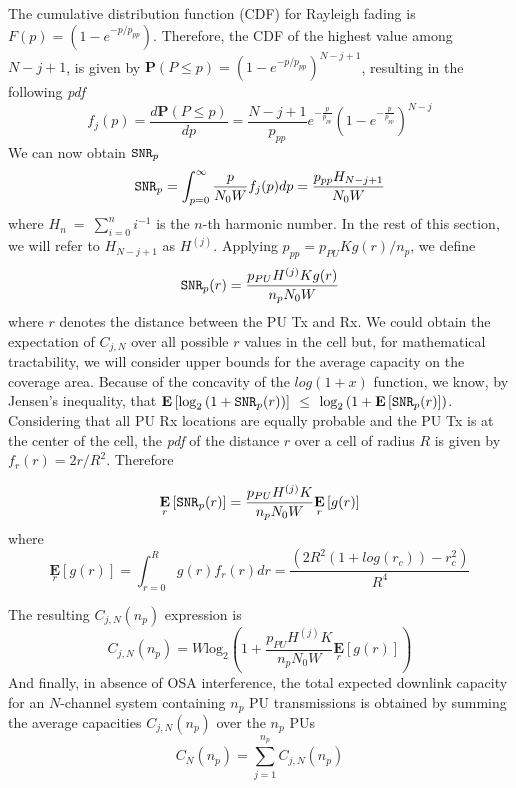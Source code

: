 The cumulative distribution function (CDF) for Rayleigh fading is $F(p)=\left(1-e^{-p/p_{pp}}\right)$.
Therefore, the CDF of the highest value among $N-j+1$, is given by $\mathbf{P}(P\leq p) = (1-e^{-p/p_{pp}})^{N-j+1}$, resulting in the following \textit{pdf}
\begin{equation}
f_{j}(p) = \displaystyle\frac{d\mathbf{P}(P\leq p)}{dp} = \frac{N-j+1}{p_{pp}}e^{-\frac{p}{p_{pp}}}\left(1-e^{-\frac{p}{p_{pp}}}\right)^{N-j}
\end{equation}
We can now obtain $\text{\ttfamily{SNR}}_{p}$
\begin{equation}
\text{\ttfamily{SNR}}_{p} = \displaystyle\int_{p=0}^{\infty}\displaystyle\frac{p}{N_{0}W}f_{j}(p)dp = \displaystyle\frac{p_{pp}H_{N-j+1}}{N_{0}W}
\end{equation}
where $H_{n}~=~\sum_{i=0}^{n}i^{-1}$ is the $n$-th harmonic number. In the rest of this section, we will refer to $H_{N-j+1}$ as $H^{(j)}$. Applying $p_{pp}=p_{PU}Kg(r)/n_{p}$, we define
\begin{equation}
\text{\ttfamily{SNR}}_{p}(r) = \displaystyle\frac{p_{PU}H^{(j)}Kg(r)}{n_{p}N_{0}W}
\end{equation}
where $r$ denotes the distance between the PU Tx and Rx.
We could obtain the expectation of $C_{j,N}$ over all possible $r$ values in the cell but, for mathematical tractability, we will consider upper bounds for the average capacity on the coverage area. Because of the concavity of the $log(1+x)$ function, we know, by Jensen's inequality, that $\mathbf{E}\left[\text{log}_{2}\left(1+\text{\ttfamily{SNR}}_{p}(r)\right)\right]$ $\leq$ $\text{log}_{2}\left(1+\mathbf{E}\left[\text{\ttfamily{SNR}}_{p}(r)\right]\right)$.
Considering that all PU Rx locations are equally probable and the PU Tx is at the center of the cell, the \textit{pdf} of the distance $r$ over a cell of radius $R$ is given by $f_{r}(r)=2r/R^{2}$. Therefore

\begin{equation}\label{SNRp}
\underset{r}{\mathbf{E}}\left[\text{\ttfamily{SNR}}_{p}(r)\right] = \displaystyle\frac{p_{PU} H^{(j)}K}{n_{p}N_{0}W}\underset{r}{\mathbf{E}}\left[g(r)\right]
\end{equation}
where
\begin{equation}\label{Egr}
\underset{r}{\mathbf{E}}\left[g(r)\right] = \int_{r=0}^{R}g(r)f_{r}(r)dr = \frac{\left(2R^{2}\left(1+log(r_{c})\right)-r_{c}^{2}\right)}{R^{4}}
\end{equation}

The resulting $C_{j,N}(n_{p})$ expression is
\begin{equation}\label{CjN}
C_{j,N}(n_{p}) = 
W\text{log}_{2}\left(1+\frac{p_{PU}H^{(j)}K}{n_{p}N_{0}W}\underset{r}{\mathbf{E}}\left[g(r)\right]\right)
\end{equation}
And finally, in absence of OSA interference, the total expected downlink capacity for an $N$-channel system containing $n_{p}$ PU transmissions is obtained by summing the average capacities $C_{j,N}\left(n_{p}\right)$ over the $n_{p}$ PUs
\begin{equation}\label{totalCapacity}
C_{N}\left(n_{p}\right) = \displaystyle\sum_{j=1}^{n_{p}}C_{j,N}\left(n_{p}\right)
\end{equation}

